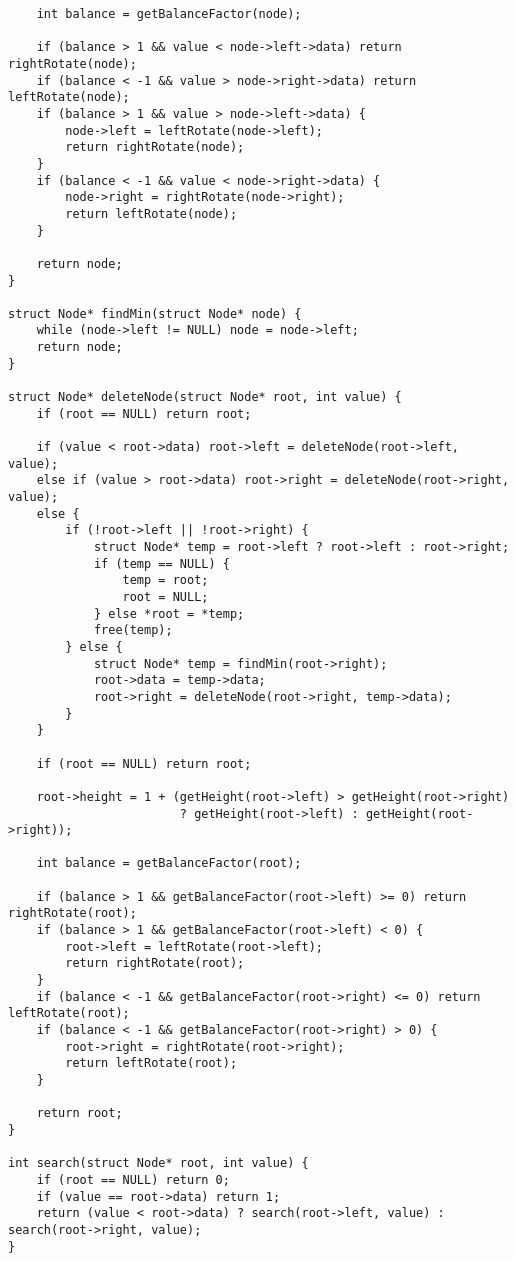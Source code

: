 \documentclass[12pt,a4paper]{article}
\begin{document}
\begin{lstlisting}
    int balance = getBalanceFactor(node);

    if (balance > 1 && value < node->left->data) return rightRotate(node);
    if (balance < -1 && value > node->right->data) return leftRotate(node);
    if (balance > 1 && value > node->left->data) {
        node->left = leftRotate(node->left);
        return rightRotate(node);
    }
    if (balance < -1 && value < node->right->data) {
        node->right = rightRotate(node->right);
        return leftRotate(node);
    }

    return node;
}

struct Node* findMin(struct Node* node) {
    while (node->left != NULL) node = node->left;
    return node;
}

struct Node* deleteNode(struct Node* root, int value) {
    if (root == NULL) return root;

    if (value < root->data) root->left = deleteNode(root->left, value);
    else if (value > root->data) root->right = deleteNode(root->right, value);
    else {
        if (!root->left || !root->right) {
            struct Node* temp = root->left ? root->left : root->right;
            if (temp == NULL) {
                temp = root;
                root = NULL;
            } else *root = *temp;
            free(temp);
        } else {
            struct Node* temp = findMin(root->right);
            root->data = temp->data;
            root->right = deleteNode(root->right, temp->data);
        }
    }

    if (root == NULL) return root;

    root->height = 1 + (getHeight(root->left) > getHeight(root->right)
                        ? getHeight(root->left) : getHeight(root->right));

    int balance = getBalanceFactor(root);

    if (balance > 1 && getBalanceFactor(root->left) >= 0) return rightRotate(root);
    if (balance > 1 && getBalanceFactor(root->left) < 0) {
        root->left = leftRotate(root->left);
        return rightRotate(root);
    }
    if (balance < -1 && getBalanceFactor(root->right) <= 0) return leftRotate(root);
    if (balance < -1 && getBalanceFactor(root->right) > 0) {
        root->right = rightRotate(root->right);
        return leftRotate(root);
    }

    return root;
}

int search(struct Node* root, int value) {
    if (root == NULL) return 0;
    if (value == root->data) return 1;
    return (value < root->data) ? search(root->left, value) : search(root->right, value);
}


\end{lstlisting}
\end{document}
